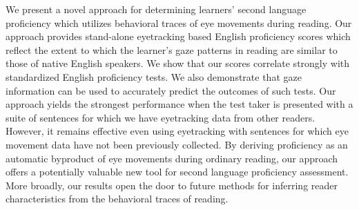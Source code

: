 We present a novel approach for determining learners' second language proficiency which utilizes behavioral traces of eye movements during reading. Our approach provides stand-alone eyetracking based English proficiency scores which reflect the extent to which the learner's gaze patterns in reading are similar to those of native English speakers. We show that our scores correlate strongly with standardized English proficiency tests. We also demonstrate that gaze information can be used to accurately predict the outcomes of such tests. Our approach yields the strongest performance when the test taker is presented with a suite of sentences for which we have eyetracking data from other readers. However, it remains effective even using eyetracking with sentences for which eye movement data have not been previously collected. By deriving proficiency as an automatic byproduct of eye movements during ordinary reading, our approach offers a potentially valuable new tool for second language proficiency assessment.  More broadly, our results open the door to future methods for inferring reader characteristics from the behavioral traces of reading.
